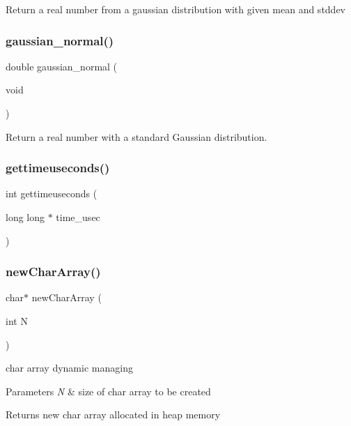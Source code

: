 Return a real number from a gaussian distribution with given mean and stddev \label{lib__util_8h_a8d93a4b3f317a076a2530b64f8f5094c} 
\subsubsection{gaussian\+\_\+normal()}
{\footnotesize\ttfamily double gaussian\+\_\+normal (\begin{DoxyParamCaption}\item[{void}]{ }\end{DoxyParamCaption})}

Return a real number with a standard Gaussian distribution. \label{lib__util_8h_a82c8fe5237ffab8806520a9c3e6d5629} 
\subsubsection{gettimeuseconds()}
{\footnotesize\ttfamily int gettimeuseconds (\begin{DoxyParamCaption}\item[{long long $\ast$}]{time\+\_\+usec }\end{DoxyParamCaption})}

\label{lib__util_8h_a5464788ff0b0aa7d80b59c71b491fd64} 
\subsubsection{new\+Char\+Array()}
{\footnotesize\ttfamily char$\ast$ new\+Char\+Array (\begin{DoxyParamCaption}\item[{int}]{N }\end{DoxyParamCaption})}



char array dynamic managing 


\begin{DoxyParams}{Parameters}
{\em N} & size of char array to be created\\
\hline
\end{DoxyParams}
\begin{DoxyReturn}{Returns}
new char array allocated in heap memory 
\end{DoxyReturn}
\label{lib__util_8h_a5ba3cf6fcab01d08810c6f218aff3eff} 

